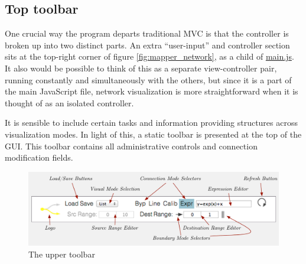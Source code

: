 
	\subsection{Top toolbar} %
	\label{sec:top_toolbar}

One crucial way the program departs traditional MVC is that the controller is broken up into two distinct parts. An extra ``user-input'' and controller section sits at the top-right corner of figure \ref{fig:mapper_network}, as a child of \url{main.js}.  It also would be possible to think of this as a separate view-controller pair, running constantly and simultaneously with the others, but since it is a part of the main JavaScript file, network visualization is more straightforward when it is thought of as an isolated controller.

It is sensible to include certain tasks and information providing structures across visualization modes. In light of this, a static toolbar is presented at the top of the GUI. This toolbar contains all administrative controls and connection modification fields.

\begin{figure}[!ht]
\centering
	\includegraphics[width=1\textwidth]{figures/top_toolbar}
\caption{The upper toolbar}
\label{fig:toolbar}
\end{figure}

